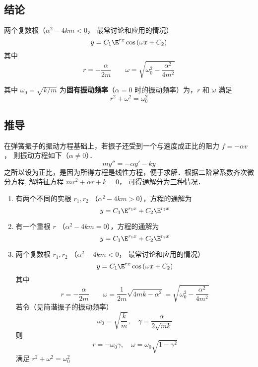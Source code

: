 
\subsection{结论}
两个复数根（${\alpha ^2} - 4km < 0$， 最常讨论和应用的情况）
\begin{equation}
y = {C_1}{\E^{rx}}\cos \left( {\omega x + {C_2}} \right)
\end{equation}
其中
\begin{equation}
r =  - \frac{\alpha }{{2m}} \qquad  \omega  = \sqrt {\omega _0^2 - \frac{{{\alpha ^2}}}{{4{m^2}}}}
\end{equation}

其中 ${\omega _0} = \sqrt {{k}/{m}}$ 为\textbf{固有振动频率}（$\alpha  = 0$ 时的振动频率）为，$r$ 和 $\omega$ 满足
\begin{equation}
{r^2} + {\omega ^2} = \omega _0^2
\end{equation}

\subsection{推导}
在弹簧振子的振动方程基础上，若振子还受到一个与速度成正比的阻力 $f =  - \alpha v$， 则振动方程如下（$\alpha \ne 0$）．
\begin{equation}
my'' =  - \alpha y' - ky
\end{equation}
之所以设为正比，是因为所得方程是线性方程，便于求解．根据二阶常系数齐次微分方程,
解特征方程 $m{r^2} + \alpha r + k = 0$， 可得通解分为三种情况．
\begin{enumerate}
\item 有两个不同的实根 $r_1,r_2$ （${\alpha ^2} - 4km > 0$），方程的通解为
\begin{equation}
y = {C_1}{\E^{{r_1}x}} + {C_2}{\E^{{r_2}x}}
\end{equation}
\item 有一个重根 $r$ （${\alpha ^2} - 4km = 0$），方程的通解为
\begin{equation}
y = {C_1}{\E^{{r_1}x}} + {C_2}{\E^{{r_2}x}}
\end{equation}
\item 两个复数根 $r_1,r_2$ （${\alpha ^2} - 4km < 0$， 最常讨论和应用的情况）
\begin{equation}
y = {C_1}{\E^{rx}}\cos \left( {\omega x + {C_2}} \right)
\end{equation}
其中
\begin{equation}
r =  - \frac{\alpha }{2m}
\qquad
\omega = \frac{1}{2m}\sqrt {4mk - {\alpha ^2}}  = \sqrt {\omega _0^2 - \frac{{{\alpha ^2}}}{{4{m^2}}}}
\end{equation}  
若令（见简谐振子的振动频率）
\begin{equation}
{\omega _0} = \sqrt {\frac{k}{m}},\quad {\gamma  = \frac{\alpha }{2\sqrt{mk}}}
\end{equation}
则 
\begin{equation}
r =  - {\omega _0}\gamma,\quad \omega  = {\omega _0}\sqrt {1 - {\gamma ^2}}
\end{equation}
满足
${r^2} + {\omega ^2} = \omega _0^2$
\end{enumerate}

